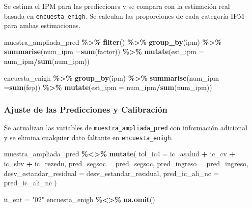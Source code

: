\documentclass[
  12pt,
]{book}
\newenvironment{Shaded}{\begin{snugshade}}{\end{snugshade}}
\newcommand{\AttributeTok}[1]{\textcolor[rgb]{0.13,0.29,0.53}{#1}}
\newcommand{\FunctionTok}[1]{\textcolor[rgb]{0.13,0.29,0.53}{\textbf{#1}}}
\newcommand{\NormalTok}[1]{#1}
\newcommand{\OtherTok}[1]{\textcolor[rgb]{0.56,0.35,0.01}{#1}}
\newcommand{\SpecialCharTok}[1]{\textcolor[rgb]{0.81,0.36,0.00}{\textbf{#1}}}
\newcommand{\StringTok}[1]{\textcolor[rgb]{0.31,0.60,0.02}{#1}}
\begin{document}
Se estima el IPM para las predicciones y se compara con la estimación real basada en \texttt{encuesta\_enigh}. Se calculan las proporciones de cada categoría IPM para ambas estimaciones.

\begin{Shaded}
\begin{Highlighting}[]
\NormalTok{muestra\_ampliada\_pred }\SpecialCharTok{\%\textgreater{}\%} \FunctionTok{filter}\NormalTok{() }\SpecialCharTok{\%\textgreater{}\%} \FunctionTok{group\_by}\NormalTok{(ipm) }\SpecialCharTok{\%\textgreater{}\%} 
  \FunctionTok{summarise}\NormalTok{(}\AttributeTok{num\_ipm =}\FunctionTok{sum}\NormalTok{(factor)) }\SpecialCharTok{\%\textgreater{}\%} 
  \FunctionTok{mutate}\NormalTok{(}\AttributeTok{est\_ipm =}\NormalTok{ num\_ipm}\SpecialCharTok{/}\FunctionTok{sum}\NormalTok{(num\_ipm))}

\NormalTok{encuesta\_enigh }\SpecialCharTok{\%\textgreater{}\%} \FunctionTok{group\_by}\NormalTok{(ipm) }\SpecialCharTok{\%\textgreater{}\%} 
  \FunctionTok{summarise}\NormalTok{(}\AttributeTok{num\_ipm =}\FunctionTok{sum}\NormalTok{(fep)) }\SpecialCharTok{\%\textgreater{}\%} 
  \FunctionTok{mutate}\NormalTok{(}\AttributeTok{est\_ipm =}\NormalTok{ num\_ipm}\SpecialCharTok{/}\FunctionTok{sum}\NormalTok{(num\_ipm))}
\end{Highlighting}
\end{Shaded}

\hypertarget{ajuste-de-las-predicciones-y-calibraciuxf3n}{%
\subsubsection*{Ajuste de las Predicciones y Calibración}\label{ajuste-de-las-predicciones-y-calibraciuxf3n}}

Se actualizan las variables de \texttt{muestra\_ampliada\_pred} con información adicional y se elimina cualquier dato faltante en \texttt{encuesta\_enigh}.

\begin{Shaded}
\begin{Highlighting}[]
\NormalTok{muestra\_ampliada\_pred   }\SpecialCharTok{\%\textless{}\textgreater{}\%} \FunctionTok{mutate}\NormalTok{(}
  \AttributeTok{tol\_ic4 =}\NormalTok{ ic\_asalud }\SpecialCharTok{+}\NormalTok{ ic\_cv }\SpecialCharTok{+}\NormalTok{  ic\_sbv }\SpecialCharTok{+}\NormalTok{ ic\_rezedu,}
  \AttributeTok{pred\_segsoc =}\NormalTok{ pred\_segsoc,}
  \AttributeTok{pred\_ingreso =}\NormalTok{ pred\_ingreso,}
  \AttributeTok{desv\_estandar\_residual =}\NormalTok{ desv\_estandar\_residual,}
  \AttributeTok{pred\_ic\_ali\_nc =}\NormalTok{ pred\_ic\_ali\_nc}
\NormalTok{) }

\NormalTok{ii\_ent }\OtherTok{=} \StringTok{"02"}
\NormalTok{encuesta\_enigh }\SpecialCharTok{\%\textless{}\textgreater{}\%} \FunctionTok{na.omit}\NormalTok{()}
\end{Highlighting}
\end{Shaded}
\end{document}
